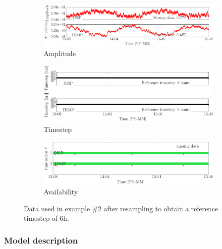 \begin{figure}[h!]
\centering
\begin{subfigure}{\linewidth}
\centering
\includegraphics[width=0.9\linewidth]{./docfigs/Example_DISPTEMPSIM/preprocessed_default/ALL_AMPLITUDES.pdf} 
\caption{Amplitude}
\end{subfigure}
\begin{subfigure}{\linewidth}
\centering
\includegraphics[width=0.9\linewidth]{./docfigs/Example_DISPTEMPSIM/preprocessed_default/ALL_TIMESTEPS.pdf}
\caption{Timestep}
\end{subfigure}
\begin{subfigure}{\linewidth}
\centering
\includegraphics[width=0.9\linewidth]{./docfigs/Example_DISPTEMPSIM/preprocessed_default/AVAILABILITY.pdf}
\caption{Availability}
\end{subfigure}
\caption{Data used in example \#2 after resampling to obtain a reference timestep of 6h.}
\label{fig:DataSummaryDefaultPreProcessed2}
\end{figure}



\subsubsection{Model description}
\label{SS:ModelConstructionExample2}

